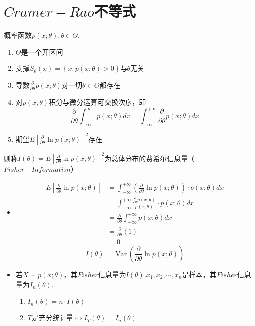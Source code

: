 \section{$Cramer-Rao$不等式}
\begin{definition}
概率函数$p(x;\theta),\theta\in\Theta.$
\begin{enumerate}
    \item $\Theta$是一个开区间
    \item 支撑$S_{\theta}(x)=\left \{ x:p(x;\theta)>0 \right \} $与$\theta$无关
    \item 导数$\frac{\partial }{\partial \theta } p(x;\theta )$对一切$\theta\in\Theta$都存在
    \item 对$p(x;\theta)$积分与微分运算可交换次序，即$$\frac{\partial}{\partial \theta} \int_{-\infty}^{\infty} p(x ; \theta) d x=\int_{-\infty}^{+\infty} \frac{\partial}{\partial \theta} p(x ; \theta) d x$$
    \item 期望$E\left [ \frac{\partial }{\partial \theta } \ln p(x;\theta ) \right ] ^{2} $存在
\end{enumerate}
则称$I(\theta)=E\left [ \frac{\partial }{\partial \theta } \ln p(x;\theta ) \right ] ^{2} $为总体分布的费希尔信息量（$Fisher \quad Information$）\\
\begin{remark}
\begin{itemize}
    \item $$\begin{aligned}
E\left[\frac{\partial}{\partial \theta} \ln p(x ; \theta)\right] &=\int_{-\infty}^{+\infty}\left(\frac{\partial}{\partial \theta} \ln p(x ; \theta)\right) \cdot p(x ; \theta) d x \\
&=\int_{-\infty}^{+\infty} \frac{\frac{\partial}{\partial \theta} p(x ; \theta)}{p(x ; \theta)} \cdot p(x ; \theta) d x \\
&=\frac{\partial}{\partial \theta} \int_{-\infty}^{+\infty} p(x ; \theta) d x \\
&=\frac{\partial}{\partial \theta}(1)\\
&=0 
\end{aligned}$$
$$I(\theta)=\operatorname{Var}\left(\frac{\partial}{\partial \theta} \ln p(x ; \theta)\right)$$
     \item 若$X\sim p(x;\theta)$，其$Fisher$信息量为$I(\theta)$.$x_{1},x_{2},\cdots,x_{n}$是样本，其$Fisher$信息量为$I_{n}(\theta).$
     \begin{enumerate}
         \item $I_{n}(\theta)=n\cdot I(\theta)$
         \item $T$是充分统计量$\Leftrightarrow I_{T}(\theta)=I_{n}(\theta)$
     \end{enumerate}
\end{itemize}
\end{remark}
\end{definition}
